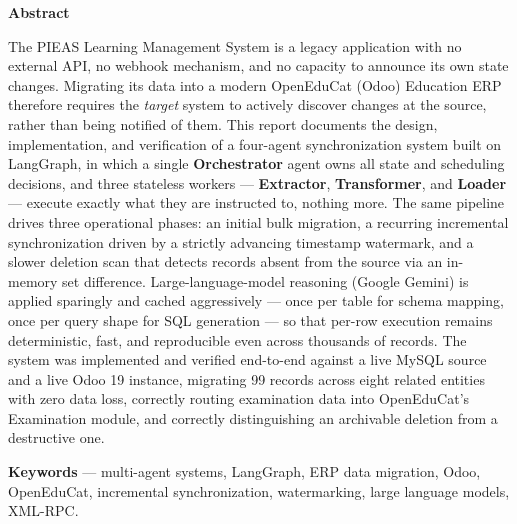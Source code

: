 \documentclass[11pt,a4paper]{article}
\begin{document}
\thispagestyle{plain}
\vspace*{0.5em}
\begin{center}
{\headingfont\Large\bfseries\color{navy} Abstract}
\end{center}
\vspace{0.6em}
\begin{tcolorbox}[enhanced,colback=cardbg,colframe=navy,boxrule=0.6pt,sharp corners,left=16pt,right=16pt,top=12pt,bottom=12pt]
The PIEAS Learning Management System is a legacy application with no external API, no webhook mechanism, and no capacity to announce its own state changes. Migrating its data into a modern OpenEduCat (Odoo) Education ERP therefore requires the \emph{target} system to actively discover changes at the source, rather than being notified of them. This report documents the design, implementation, and verification of a four-agent synchronization system built on LangGraph, in which a single \textbf{Orchestrator} agent owns all state and scheduling decisions, and three stateless workers --- \textbf{Extractor}, \textbf{Transformer}, and \textbf{Loader} --- execute exactly what they are instructed to, nothing more. The same pipeline drives three operational phases: an initial bulk migration, a recurring incremental synchronization driven by a strictly advancing timestamp watermark, and a slower deletion scan that detects records absent from the source via an in-memory set difference. Large-language-model reasoning (Google Gemini) is applied sparingly and cached aggressively --- once per table for schema mapping, once per query shape for SQL generation --- so that per-row execution remains deterministic, fast, and reproducible even across thousands of records. The system was implemented and verified end-to-end against a live MySQL source and a live Odoo 19 instance, migrating 99 records across eight related entities with zero data loss, correctly routing examination data into OpenEduCat's Examination module, and correctly distinguishing an archivable deletion from a destructive one.
\end{tcolorbox}

\vspace{1.4em}
{\headingfont\bfseries\color{navy}\normalsize Keywords} --- multi-agent systems, LangGraph, ERP data migration, Odoo, OpenEduCat, incremental synchronization, watermarking, large language models, XML-RPC.

\vspace{2.2em}
\tableofcontents
\end{document}
